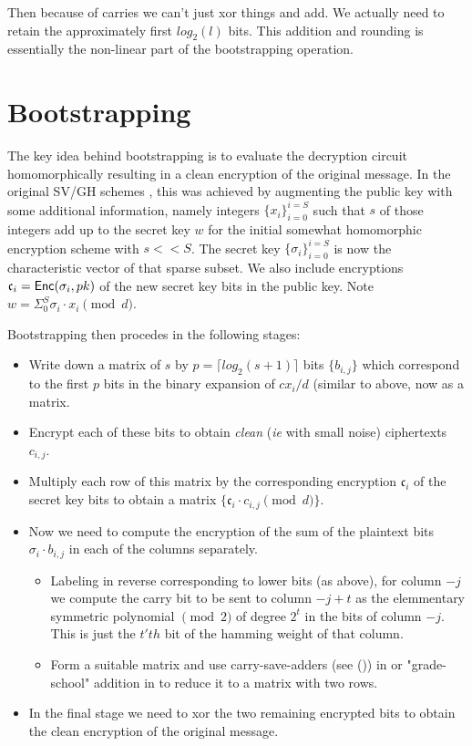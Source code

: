 \documentclass[11pt]{article}
\newcommand{\Enc}{{\sf Enc}}
\newcommand{\cnew}{{\mathfrak c}}
\begin{document}
Then because of carries we can't just xor things and add.  We actually need to retain the approximately first $log_2(l)$ bits.  This addition and rounding is essentially the non-linear part of the bootstrapping operation.



\section{Bootstrapping}
The key idea behind bootstrapping is to evaluate the decryption circuit homomorphically resulting in a clean encryption of the original message.  In the original SV/GH schemes \cite{SV10}, \cite{GH10} this was achieved by augmenting the public key with some additional information, namely integers $\{ x_i \}_{i=0}^{i=S}$ such that $s$ of those integers add up to the secret key $w$ for the initial somewhat homomorphic encryption scheme with $s << S$.  The secret key $\{\sigma_i \}_{i=0}^{i=S}$ is now the characteristic vector of that sparse subset.  We also include encryptions $\cnew_i = \Enc(\sigma_i,pk)$ of the new secret key bits in the public key. Note $w = \Sigma_{0}^{S} \sigma_i\cdot x_i \pmod{d}$.

Bootstrapping then procedes in the following stages:
\begin{itemize}
\item Write down a matrix of $s$ by $p = \lceil log_2(s+1) \rceil $ bits $\{ b_{i,j} \}$ which correspond to the first $p$ bits in the binary expansion of $cx_i / d $ (similar to above, now as a matrix.

\item Encrypt each of these bits to obtain \textit{clean} (\textit{ie} with small noise) ciphertexts $c_{i,j}$.

\item Multiply each row of this matrix by the corresponding encryption $\cnew_i$ of the secret key bits to obtain a matrix $\{ \cnew_i \cdot c_{i,j} \pmod{d} \}$.

\item Now we need to compute the encryption of the sum of the plaintext bits $\sigma_i \cdot b_{i,j}$ in each of the columns separately. 
  \begin{itemize}
  \item Labeling in reverse corresponding to lower bits (as above), for column $-j$ we compute the carry bit to be sent to column $-j+t$ as the elemmentary symmetric polynomial $\pmod{2}$ of degree $2^t$ in the bits of column $-j$.  This is just the $t'th$ bit of the hamming weight of that column. 
  \item Form a suitable matrix and use carry-save-adders (see (\cite{wiki})) in \cite{SV10} or "grade-school" addition in \cite{GH10} to reduce it to a matrix with two rows.
   \end{itemize}
\item In the final stage we need to xor the two remaining encrypted bits to obtain the clean encryption of the original message.

\end{itemize}
\end{document}
